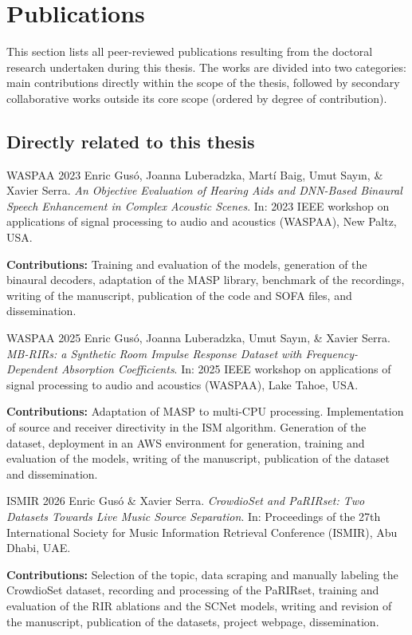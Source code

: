 
\chapter{Publications}
\label{sec:pubs}

This section lists all peer-reviewed publications resulting from the doctoral research undertaken during this thesis. The works are divided into two categories: main contributions directly within the scope of the thesis, followed by secondary collaborative works outside its core scope (ordered by degree of contribution).

\section{Directly related to this thesis}
\label{sec:pubs_first_author}

\begin{mybox}{WASPAA 2023}
    Enric Gusó, Joanna Luberadzka, Martí Baig, Umut Say\i n, \& Xavier Serra.
    \emph{An Objective Evaluation of Hearing Aids and DNN-Based Binaural Speech Enhancement in Complex Acoustic Scenes}.
    In: 2023 IEEE workshop on applications of signal processing to audio and acoustics (WASPAA), New Paltz, USA. 
\end{mybox}
\textbf{Contributions:} Training and evaluation of the models, generation of the binaural decoders, adaptation of the \acrshort{MASP} library, benchmark of the  recordings, writing of the manuscript, publication of the code and \acrshort{SOFA} files, and dissemination.

\begin{mybox}{WASPAA 2025}
    Enric Gusó, Joanna Luberadzka, Umut Say\i n, \& Xavier Serra.
    \emph{MB-RIRs: a Synthetic Room Impulse Response Dataset with Frequency-Dependent Absorption Coefficients}.
    In: 2025 IEEE workshop on applications of signal processing to audio and acoustics (WASPAA), Lake Tahoe, USA. 
\end{mybox}
\textbf{Contributions:} Adaptation of \acrshort{MASP} to multi-CPU processing. Implementation of source and receiver directivity in the \acrshort{ISM} algorithm. Generation of the dataset, deployment in an AWS environment for generation, training and evaluation of the models, writing of the manuscript, publication of the dataset and dissemination.

\begin{mybox}{ISMIR 2026}
    Enric Gusó \& Xavier Serra.
    \emph{CrowdioSet and PaRIRset: Two Datasets Towards Live Music Source Separation}.
    In: Proceedings of the 27th International Society for Music Information Retrieval Conference (ISMIR), Abu Dhabi, UAE. 
\end{mybox}
\textbf{Contributions:} Selection of the topic, data scraping and manually labeling the CrowdioSet dataset, recording and processing of the PaRIRset, training and evaluation of the \acrshort{RIR} ablations and the SCNet models, writing and revision of the manuscript, publication of the datasets, project webpage, dissemination.

